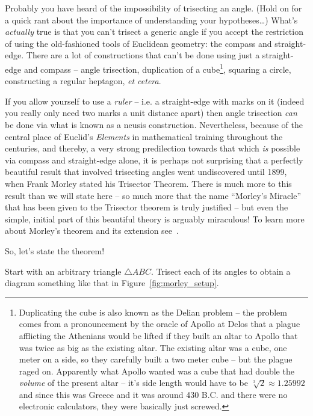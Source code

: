 Probably you have heard of the impossibility of trisecting an angle.  
(Hold on for a quick rant about the importance of understanding your
hypotheses\ldots)  What's \emph{actually} true is that you can't trisect
a generic angle if you accept the restriction of using the old-fashioned
tools of Euclidean geometry: the compass and straight-edge.  There 
are a lot of constructions that can't be done using just a 
straight-edge and compass
-- angle trisection, duplication of a cube\footnote{Duplicating the cube 
is also known as the Delian problem -- the problem comes from a pronouncement
by the oracle of Apollo at Delos that a plague afflicting the Athenians would
be lifted if they built an altar to Apollo that was twice as big as the 
existing altar.  The existing altar was a cube, one meter on a side, so they
carefully built a two meter cube -- but the plague raged on.  Apparently what
Apollo wanted was a cube that had double the \emph{volume} of the 
present altar -- it's side length would have to be 
$\sqrt[3]{2} \approx 1.25992$ and since this was Greece and it was around 
430 B.C. and there were no electronic calculators, they were basically
just screwed.}, squaring a circle, constructing a regular heptagon, \emph{et cetera}.

If you allow yourself to use a \emph{ruler} -- i.e. a straight-edge with
marks on it (indeed you really only need two marks a unit distance apart) 
then angle trisection \emph{can} be done via what is known as a 
neusis construction.
Nevertheless, because of the central place of Euclid's \emph{Elements} in
mathematical training throughout the centuries, and thereby, a very
strong predilection towards that which \emph{is} possible via compass and straight-edge
alone, it is perhaps not surprising that a perfectly beautiful result that
involved trisecting angles went undiscovered until 1899, when Frank Morley
stated his Trisector Theorem.  There is much more to this result than we will
state here -- so much more that the name ``Morley's Miracle'' that has been
given to the Trisector theorem is truly justified -- but even the simple,
initial part of this beautiful theory is arguably miraculous!  To learn more
about Morley's theorem and its extension see~\cite{lighthouse}.

So, let's state the theorem!

Start with an arbitrary triangle ${\triangle}ABC$.  Trisect each of its angles
to obtain a diagram something like that in Figure~\ref{fig:morley_setup}.

